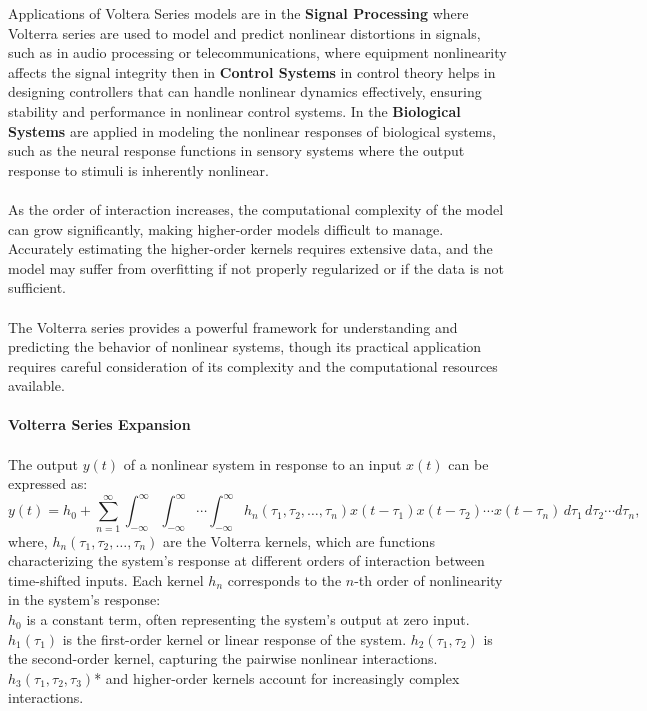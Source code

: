 \documentclass[12pt]{article}
\begin{document}
    \noindent Applications of Voltera Series models are in the \textbf{Signal Processing} where Volterra series
    are used to model and predict nonlinear distortions in signals, such as
    in audio processing or telecommunications, where equipment nonlinearity affects the
    signal integrity then in \textbf{Control Systems} in control theory helps in designing controllers
    that can handle nonlinear dynamics effectively, ensuring stability and performance in
    nonlinear control systems. In the \textbf{Biological Systems} are applied in modeling
    the nonlinear responses of biological systems, such as the neural response functions
    in sensory systems where the output response to stimuli is inherently nonlinear.\\
    \\
    As the order of interaction increases, the computational complexity of the model can
    grow significantly, making higher-order models difficult to manage. Accurately estimating
    the higher-order kernels requires extensive data, and the model may suffer from
    overfitting if not properly regularized or if the data is not sufficient.\\
    \\
    The Volterra series provides a powerful framework for understanding and predicting
    the behavior of nonlinear systems, though its practical application requires careful
    consideration of its complexity and the computational resources available.\\
    \\
    \textbf{Volterra Series Expansion}\\
    \\
    The output \( y(t) \) of a nonlinear system in response to an input \( x(t) \) can be
    expressed as:
    \begin{equation}
        y(t) = h_0 + \sum_{n=1}^{\infty} \int_{-\infty}^\infty \int_{-\infty}^\infty \cdots \int_{-\infty}^\infty h_n(\tau_1, \tau_2, \ldots, \tau_n) x(t-\tau_1) x(t-\tau_2) \cdots x(t-\tau_n) \, d\tau_1 \, d\tau_2 \cdots d\tau_n,
    \end{equation}
    \noindent where, \( h_n(\tau_1, \tau_2, \ldots, \tau_n) \) are the Volterra kernels, which
    are functions characterizing the system's response at different orders of interaction
    between time-shifted inputs. Each kernel \( h_n \) corresponds to the \( n \)-th order
    of nonlinearity in the system's response:\\

    \noindent \( h_0 \) is a constant term, often representing the system's output at zero input.
    \( h_1(\tau_1) \) is the first-order kernel or linear response of the system.
    \( h_2(\tau_1, \tau_2) \) is the second-order kernel, capturing the pairwise nonlinear interactions.
    \( h_3(\tau_1, \tau_2, \tau_3) \)* and higher-order kernels account for increasingly complex interactions.\\
    
\end{document}
